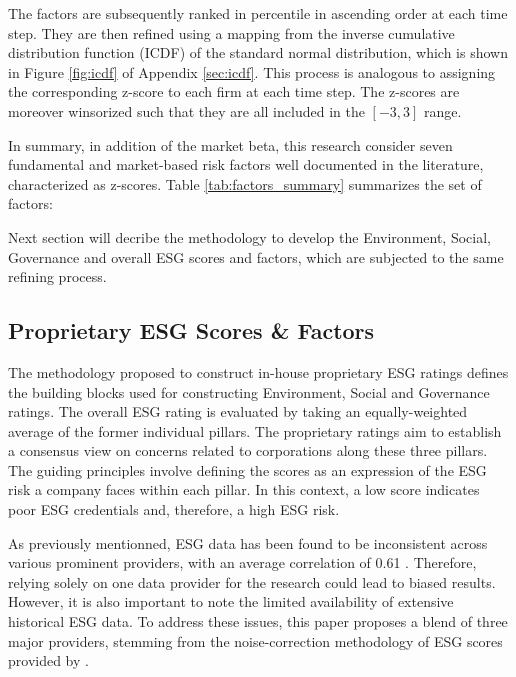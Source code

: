 \documentclass[11pt,a4paper]{article}
\begin{document}
The factors are subsequently ranked in percentile in ascending order at each time step. 
They are then refined using a mapping from the inverse cumulative distribution function (ICDF) of the standard normal distribution, which is shown in Figure \ref{fig:icdf} of Appendix \ref{sec:icdf}. 
This process is analogous to assigning the corresponding z-score to each firm at each time step. 
The z-scores are moreover winsorized such that they are all included in the $[-3,3]$ range. 

In summary, in addition of the market beta, this research consider seven fundamental and market-based risk factors well documented in the literature, characterized as z-scores.
Table \ref{tab:factors_summary} summarizes the set of factors:

\begin{center}
    
    \label{tab:factors_summary}
\end{center}

Next section will decribe the methodology to develop the Environment, Social, Governance and overall ESG scores and factors, which are subjected to the same refining process.

\subsection{Proprietary ESG Scores \& Factors}\label{subsec:esg_data}

The methodology proposed to construct in-house proprietary ESG ratings defines the building blocks used for constructing Environment, Social and Governance ratings.
The overall ESG rating is evaluated by taking an equally-weighted average of the former individual pillars.
The proprietary ratings aim to establish a consensus view on concerns related to corporations along these three pillars. 
The guiding principles involve defining the scores as an expression of the ESG risk a company faces within each pillar. 
In this context, a low score indicates poor ESG credentials and, therefore, a high ESG risk.

As previously mentionned, ESG data has been found to be inconsistent across various prominent providers, with an average correlation of 0.61 \cite{stackpole2021sustainable}. 
Therefore, relying solely on one data provider for the research could lead to biased results. 
However, it is also important to note the limited availability of extensive historical ESG data. 
To address these issues, this paper proposes a blend of three major providers, stemming from the noise-correction methodology of ESG scores provided by .
\end{document}
